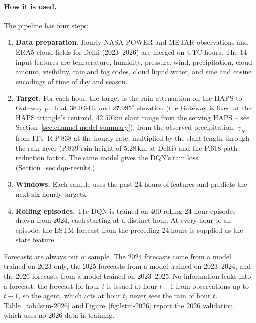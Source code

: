 \documentclass[conference]{IEEEtran}
\begin{document}
\paragraph{How it is used.} The pipeline has four steps:
\begin{enumerate}
\item \textbf{Data preparation.} Hourly NASA POWER and METAR observations and ERA5 cloud fields for Delhi (2023--2026) are merged on UTC hours. The 14 input features are temperature, humidity, pressure, wind, precipitation, cloud amount, visibility, rain and fog codes, cloud liquid water, and sine and cosine encodings of time of day and season.
\item \textbf{Target.} For each hour, the target is the rain attenuation on the HAPS-to-Gateway path at $38.0$\,GHz and $27.995^\circ$ elevation (the Gateway is fixed at the HAPS triangle's centroid, 42.50\,km slant range from the serving HAPS -- see Section~\ref{sec:channel-model-summary}), from the observed precipitation: $\gamma_R$ from ITU-R P.838 at the hourly rate, multiplied by the slant length through the rain layer (P.839 rain height of $5.28$\,km at Delhi) and the P.618 path reduction factor. The same model gives the DQN's rain loss (Section~\ref{sec:dqn-results}).
\item \textbf{Windows.} Each sample uses the past 24 hours of features and predicts the next six hourly targets.
\item \textbf{Rolling episodes.} The DQN is trained on $400$ rolling 24-hour episodes drawn from 2024, each starting at a distinct hour. At every hour of an episode, the LSTM forecast from the preceding 24 hours is supplied as the state feature.
\end{enumerate}

Forecasts are always out of sample. The 2024 forecasts come from a model trained on 2023 only, the 2025 forecasts from a model trained on 2023--2024, and the 2026 forecasts from a model trained on 2023--2025. No information leaks into a forecast: the forecast for hour $t$ is issued at hour $t{-}1$ from observations up to $t{-}1$, so the agent, which acts at hour $t$, never sees the rain of hour $t$. Table~\ref{tab:lstm-2026} and Figure~\ref{fig:lstm-2026} report the 2026 validation, which uses no 2026 data in training.
\end{document}
